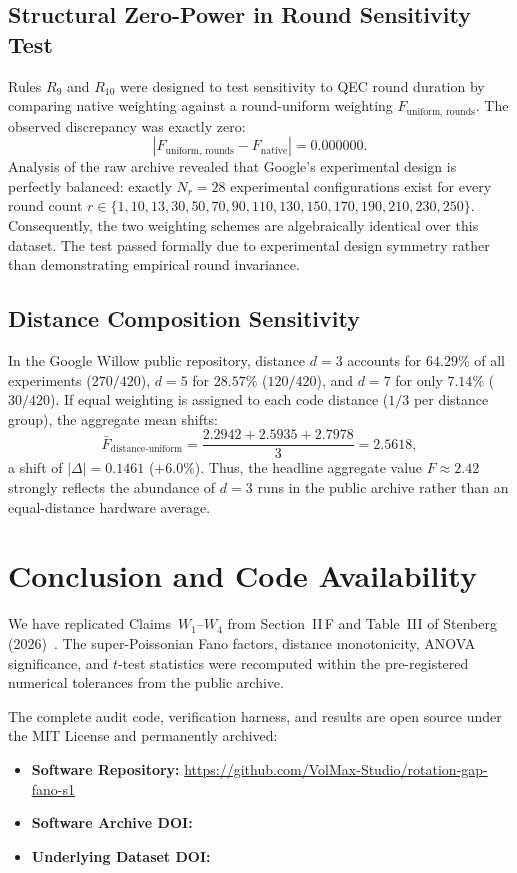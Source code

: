 \subsection{Structural Zero-Power in Round Sensitivity Test}
Rules $R_9$ and $R_{10}$ were designed to test sensitivity to QEC round duration by comparing native weighting against a round-uniform weighting $F_{\text{uniform, rounds}}$. The observed discrepancy was exactly zero:
\begin{equation}
|F_{\text{uniform, rounds}} - F_{\text{native}}| = 0.000000.
\end{equation}
Analysis of the raw archive revealed that Google's experimental design is perfectly balanced: exactly $N_r = 28$ experimental configurations exist for every round count $r \in \{1, 10, 13, 30, 50, 70, 90, 110, 130, 150, 170, 190, 210, 230, 250\}$. Consequently, the two weighting schemes are algebraically identical over this dataset. The test passed formally due to experimental design symmetry rather than demonstrating empirical round invariance.

\subsection{Distance Composition Sensitivity}
In the Google Willow public repository, distance $d=3$ accounts for $64.29\%$ of all experiments ($270/420$), $d=5$ for $28.57\%$ ($120/420$), and $d=7$ for only $7.14\%$ ($30/420$). If equal weighting is assigned to each code distance ($1/3$ per distance group), the aggregate mean shifts:
\begin{equation}
\bar{F}_{\text{distance-uniform}} = \frac{2.2942 + 2.5935 + 2.7978}{3} = 2.5618,
\end{equation}
a shift of $|\Delta| = 0.1461$ ($+6.0\%$). Thus, the headline aggregate value $F \approx 2.42$ strongly reflects the abundance of $d=3$ runs in the public archive rather than an equal-distance hardware average.

\section{Conclusion and Code Availability}

We have replicated Claims~$W_1$–$W_4$ from Section~II\,F and Table~III of Stenberg (2026)~\cite{stenberg2026rotation}. The super-Poissonian Fano factors, distance monotonicity, ANOVA significance, and $t$-test statistics were recomputed within the pre-registered numerical tolerances from the public archive.

The complete audit code, verification harness, and results are open source under the MIT License and permanently archived:
\begin{itemize}
    \item \textbf{Software Repository:} \url{https://github.com/VolMax-Studio/rotation-gap-fano-s1}
    \item \textbf{Software Archive DOI:} ~\cite{volmax_fano_audit_2026}
    \item \textbf{Underlying Dataset DOI:} ~\cite{willow_dataset_2024}
\end{itemize}
